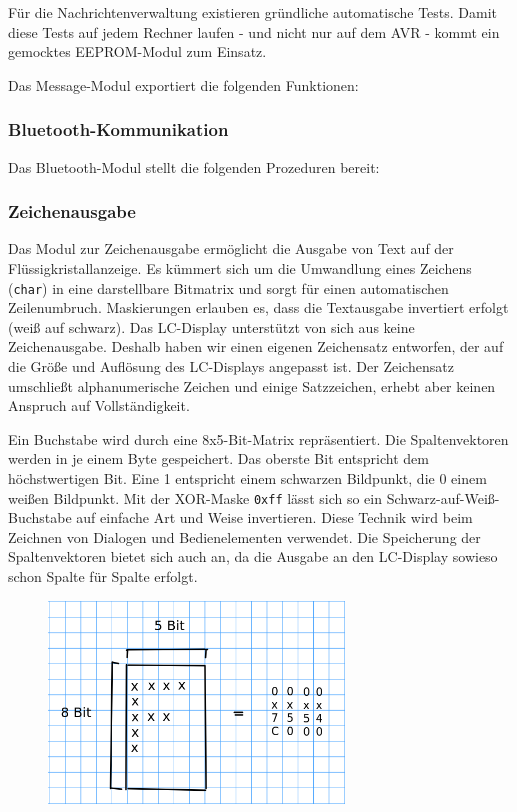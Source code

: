 \documentclass[ngerman]{article}
\begin{document}
Für die Nachrichtenverwaltung existieren gründliche automatische Tests.  Damit
diese Tests auf jedem Rechner laufen - und nicht nur auf dem AVR - kommt ein
gemocktes EEPROM-Modul zum Einsatz.

Das Message-Modul exportiert die folgenden Funktionen:




\subsubsection{Bluetooth-Kommunikation}

Das Bluetooth-Modul stellt die folgenden Prozeduren bereit:




\subsubsection{Zeichenausgabe}

Das Modul zur Zeichenausgabe ermöglicht die Ausgabe von Text auf der
Flüs\-sig\-kris\-tall\-an\-zei\-ge. Es kümmert sich um die Umwandlung eines
Zeichens ({\tt char}) in eine darstellbare Bitmatrix und sorgt für einen
automatischen Zeilenumbruch. Maskierungen erlauben es, dass die Textausgabe
invertiert erfolgt (weiß auf schwarz). Das LC-Display unterstützt von sich aus
keine Zeichenausgabe. Deshalb haben wir einen eigenen Zeichensatz entworfen,
der auf die Größe und Auflösung des LC-Displays angepasst ist. Der Zeichensatz
umschließt alphanumerische Zeichen und einige Satzzeichen, erhebt aber keinen
Anspruch auf Vollständigkeit.

Ein Buchstabe wird durch eine 8x5-Bit-Matrix repräsentiert. Die
Spaltenvektoren werden in je einem Byte gespeichert. Das oberste Bit
entspricht dem höchstwertigen Bit. Eine 1 entspricht einem schwarzen
Bildpunkt, die 0 einem weißen Bildpunkt. Mit der XOR-Maske {\tt 0xff} lässt
sich so ein Schwarz-auf-Weiß-Buchstabe auf einfache Art und Weise
invertieren. Diese Technik wird beim Zeichnen von Dialogen und Bedienelementen 
verwendet. Die Speicherung der Spaltenvektoren bietet sich auch an,
da die Ausgabe an den LC-Display sowieso schon Spalte für Spalte erfolgt.

\begin{figure}[h!] \begin{center}
    \includegraphics[width=0.7\textwidth]{media/char}
\end{center} \end{figure}
\end{document}
